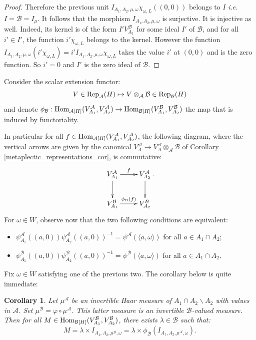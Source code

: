 \documentclass[11pt]{article}
\theoremstyle{plain}
\newtheorem{cor}[theo]{Corollary}
\theoremstyle{definition}
\theoremstyle{plain}
\theoremstyle{definition}
\theoremstyle{plain}
\begin{document}
\begin{proof}
Therefore the previous unit $I_{A_1,A_2,\mu,\omega} \chi_{\omega,L}((0,0))$ belongs to $I$ \textit{i.e.} $I=\mathcal{B}=I_\mu$.  It follows that the morphism $I_{A_1,A_2,\mu,\omega}$ is surjective. It is injective as well. Indeed, its kernel is of the form $I' V_{A_1}^\mathcal{B}$ for some ideal $I'$ of $\mathcal{B}$, and for all $i' \in I'$, the function $i' \chi_{\omega,L}$ belongs to the kernel. However the function $I_{A_1,A_2,\mu,\omega} (i' \chi_{\omega,L}) = i' I_{A_1,A_2,\mu,\omega} \chi_{\omega,L}$ takes the value $i'$ at $(0,0)$ and is the zero function. So $i'=0$ and $I'$ is the zero ideal of $\mathcal{B}$. \end{proof}

Consider the scalar extension functor:
$$V \in \textup{Rep}_\mathcal{A}(H) \mapsto V \otimes_\mathcal{A} \mathcal{B} \in \textup{Rep}_\mathcal{B}(H)$$
and denote $\phi_\mathcal{B} : \textup{Hom}_{\mathcal{A}[H]}(V_{A_1}^\mathcal{A},V_{A_2}^\mathcal{A}) \to \textup{Hom}_{\mathcal{B}[H]}(V_{A_1}^\mathcal{B},V_{A_2}^\mathcal{B})$ the map that is induced by functoriality.

In particular for all  $f \in \textup{Hom}_{\mathcal{A}[H]}(V_{A_1}^\mathcal{A},V_{A_2}^\mathcal{A})$, the following diagram, where the vertical arrows are given by the canonical $V_A^\mathcal{A} \to V_A^\mathcal{A} \otimes_\mathcal{A} \mathcal{B}$ of Corollary \ref{metaplectic_representations_cor}, is commutative:
$$\xymatrix{
		V_{A_1}^\mathcal{A} \ar[r]^{f} \ar[d] & V_{A_2}^\mathcal{A}  \ar[d] \\
		V_{A_1}^\mathcal{B} \ar[r]^{\phi_\mathcal{B}(f)} & V_{A_2}^\mathcal{B}
		}.$$
For $\omega \in W$, observe now that the two following conditions are equivalent:
\begin{itemize}[label=$\bullet$]
\item $\psi_{A_1}^\mathcal{A} ((a,0)) \psi_{A_2}^\mathcal{A} ((a,0))^{-1} = \psi^\mathcal{A}( \langle a ,\omega \rangle)$ for all $a \in A_1 \cap A_2$; 
\item $\psi_{A_1}^\mathcal{B} ((a,0)) \psi_{A_2}^\mathcal{B} ((a,0))^{-1} = \psi^\mathcal{B}( \langle a ,\omega \rangle)$ for all $a \in A_1 \cap A_2$.
\end{itemize}
Fix $\omega \in W$ satisfying one of the previous two. The corollary below is quite immediate:

\begin{cor} \label{intertwining_maps_models_A1_A2_cor} Let $\mu^\mathcal{A}$ be an invertible Haar measure of $A_1 \cap A_2 \backslash A_2$ with values in $\mathcal{A}$. Set $\mu^\mathcal{B} = \varphi \circ \mu^\mathcal{A}$. This latter measure is an invertible $\mathcal{B}$-valued measure. Then for all $M \in \textup{Hom}_{\mathcal{B}[H]}(V_{A_1}^\mathcal{B},V_{A_2}^\mathcal{B})$, there exists $\lambda \in \mathcal{B}$ such that:
$$M = \lambda \times I_{A_1,A_2,\mu^\mathcal{B},\omega} = \lambda \times \phi_\mathcal{B}(I_{A_1,A_2,\mu^\mathcal{A},\omega}).$$ \end{cor}
\end{document}
